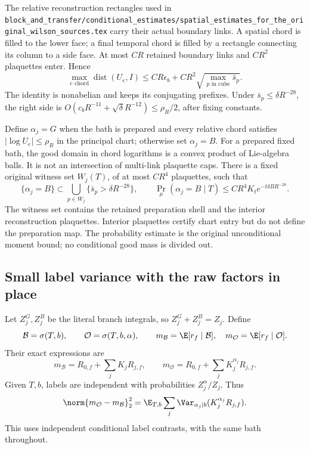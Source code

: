 The relative reconstruction rectangles used in \texttt{block\_and\_transfer/conditional\_estimates/spatial\_estimates\_for\_the\_original\_wilson\_sources.tex} carry their actual boundary links. A spatial chord is filled to the lower face; a final temporal chord is filled by a rectangle connecting its column to a side face. At most \(CR\) retained boundary links and \(CR^2\) plaquettes enter. Hence
\begin{equation}
 \max_{e\text{ chord}}\operatorname{dist}(U_e,I)
 \le CR\epsilon_b+CR^2\sqrt{\max_{p\text{ in cube}}\bar s_p}.
 \label{cb:nonflatreconstruction}
\end{equation}
The identity is nonabelian and keeps its conjugating prefixes. Under \(\bar s_p\le\delta R^{-28}\), the right side is \(O(c_bR^{-11}+\sqrt\delta R^{-12})\le\rho_R/2\), after fixing constants.

Define \(\alpha_j=G\) when the bath is prepared and every relative chord satisfies \(|\log U_e|\le\rho_R\) in the principal chart; otherwise set \(\alpha_j=B\). For a prepared fixed bath, the good domain in chord logarithms is a convex product of Lie-algebra balls. It is not an intersection of multi-link plaquette caps. There is a fixed original witness set \(W_j(T)\), of at most \(CR^4\) plaquettes, such that
\begin{equation}
 \{\alpha_j=B\}\subset
 \bigcup_{p\in W_j}\{\bar s_p>\delta R^{-28}\},\qquad
 \Pr_\mu(\alpha_j=B\mid T)
 \le CR^4K_t e^{-t\delta BR^{-28}}.
 \label{cb:badmass}
\end{equation}
The witness set contains the retained preparation shell and the interior reconstruction plaquettes. Interior plaquettes certify chart entry but do not define the preparation map. The probability estimate is the original unconditional moment bound; no conditional good mass is divided out.

\subsection{Small label variance with the raw factors in place}

Let \(Z_j^G,Z_j^B\) be the literal branch integrals, so \(Z_j^G+Z_j^B=Z_j\). Define
\[
 \mathcal B=\sigma(T,b),\qquad \mathcal O=\sigma(T,b,\alpha),\qquad
 m_{\mathcal B}=\E[r_f\mid\mathcal B],\quad
 m_{\mathcal O}=\E[r_f\mid\mathcal O].
\]
Their exact expressions are
\begin{equation}
 m_{\mathcal B}=R_{0,f}+\sum_jK_jR_{j,f},\qquad
 m_{\mathcal O}=R_{0,f}+\sum_jK_j^{\alpha_j}R_{j,f}.
 \label{cb:means}
\end{equation}
Given \(T,b\), labels are independent with probabilities \(Z_j^\alpha/Z_j\). Thus
\begin{equation}
 \norm{m_{\mathcal O}-m_{\mathcal B}}_2^2
 =\E_{T,b}\sum_j\Var_{\alpha_j\mid b}
                      (K_j^{\alpha_j}R_{j,f}).
 \label{cb:labelidentity}
\end{equation}
This uses independent conditional label contrasts, with the same bath throughout.


